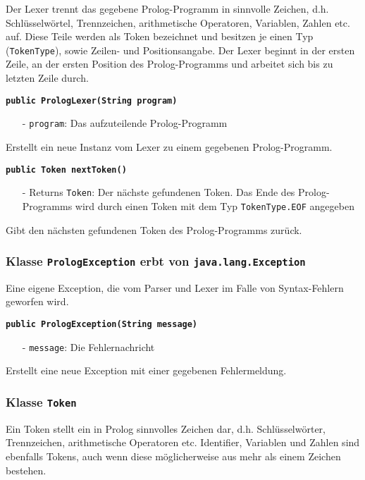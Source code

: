 \documentclass[parskip=full,11pt,twoside]{scrartcl}
\begin{document}
Der Lexer trennt das gegebene Prolog-Programm in sinnvolle Zeichen, d.h. Schlüsselwörtel, Trennzeichen, arithmetische Operatoren, Variablen, Zahlen etc. auf. Diese Teile werden als Token bezeichnet und besitzen je einen Typ (\texttt{TokenType}), sowie Zeilen- und Positionsangabe. Der Lexer beginnt in der ersten Zeile, an der ersten Position des Prolog-Programms und arbeitet sich bis zu letzten Zeile durch.

\textbf{\texttt{public PrologLexer(String program)}}
\begin{itemize}[noitemsep]
	\item[-] \texttt{program}: Das aufzuteilende Prolog-Programm
\end{itemize}
Erstellt ein neue Instanz vom Lexer zu einem gegebenen Prolog-Programm.

\textbf{\texttt{public Token nextToken()}}
\begin{itemize}[noitemsep]
	\item[-] Returns \texttt{Token}: Der nächste gefundenen Token. Das Ende des Prolog-Programms wird durch einen Token mit dem Typ \texttt{TokenType.EOF} angegeben
\end{itemize}
Gibt den nächsten gefundenen Token des Prolog-Programms zurück.

\subsubsection{Klasse \texttt{PrologException} erbt von \texttt{java.lang.Exception}}

Eine eigene Exception, die vom Parser und Lexer im Falle von Syntax-Fehlern geworfen wird.

\textbf{\texttt{public PrologException(String message)}}
\begin{itemize}[noitemsep]
	\item[-] \texttt{message}: Die Fehlernachricht
\end{itemize}
Erstellt eine neue Exception mit einer gegebenen Fehlermeldung.

\subsubsection{Klasse \texttt{Token}}

Ein Token stellt ein in Prolog sinnvolles Zeichen dar, d.h. Schlüsselwörter, Trennzeichen, arithmetische Operatoren etc. Identifier, Variablen und Zahlen sind ebenfalls Tokens, auch wenn diese möglicherweise aus mehr als einem Zeichen bestehen.
\end{document}
